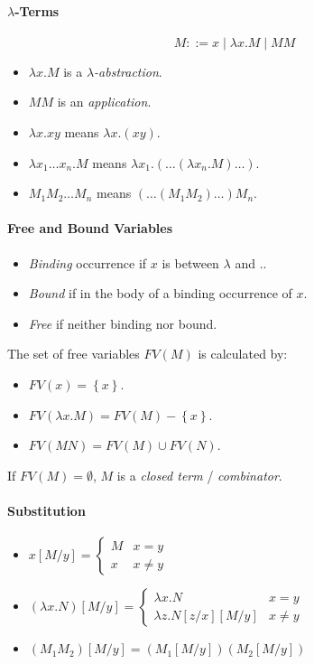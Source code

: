 \documentclass[twocolumn,english]{article}
\begin{document}
\paragraph{$\lambda$-Terms}

\[
M::=x\mid\lambda x.M\mid MM
\]
\begin{itemize}
\item $\lambda x.M$ is a \emph{$\lambda$-abstraction}.
\item $MM$ is an \emph{application}.
\item $\lambda x.xy$ means $\lambda x.\left(xy\right)$.
\item $\lambda x_{1}\dots x_{n}.M$ means $\lambda x_{1}.\left(\dots\left(\lambda x_{n}.M\right)\dots\right)$.
\item $M_{1}M_{2}\dots M_{n}$ means $\left(\dots\left(M_{1}M_{2}\right)\dots\right)M_{n}$.
\end{itemize}

\paragraph{Free and Bound Variables}
\begin{itemize}
\item \emph{Binding} occurrence if $x$ is between $\lambda$ and $.$.
\item \emph{Bound} if in the body of a binding occurrence of $x$.
\item \emph{Free} if neither binding nor bound.
\end{itemize}
The set of free variables $FV\left(M\right)$ is calculated by:
\begin{itemize}
\item $FV\left(x\right)=\left\{ x\right\} $.
\item $FV\left(\lambda x.M\right)=FV\left(M\right)-\left\{ x\right\} $.
\item $FV\left(MN\right)=FV\left(M\right)\cup FV\left(N\right)$.
\end{itemize}
If $FV\left(M\right)=\emptyset$, $M$ is a \emph{closed term} / \emph{combinator}.

\paragraph{Substitution}
\begin{itemize}
\item $x\left[M/y\right]=\begin{cases}
M & x=y\\
x & x\neq y
\end{cases}$
\item $\left(\lambda x.N\right)\left[M/y\right]=\begin{cases}
\lambda x.N & x=y\\
\lambda z.N\left[z/x\right]\left[M/y\right] & x\neq y
\end{cases}$
\item $\left(M_{1}M_{2}\right)\left[M/y\right]=\left(M_{1}\left[M/y\right]\right)\left(M_{2}\left[M/y\right]\right)$
\end{itemize}
\end{document}
